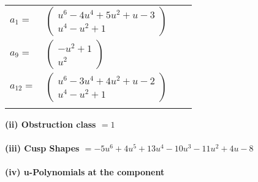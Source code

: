 \documentclass[1p]{elsarticle_modified}
\theoremstyle{definition}
\begin{document}
\begin{tabular}{m{7pt} m{180pt} m{7pt} m{180pt} }
\flushright $a_{1}=$&$\begin{pmatrix}u^6-4 u^4+5 u^2+u-3\\u^4- u^2+1\end{pmatrix}$ \\
\flushright $a_{9}=$&$\begin{pmatrix}- u^2+1\\u^2\end{pmatrix}$ \\
\flushright $a_{12}=$&$\begin{pmatrix}u^6-3 u^4+4 u^2+u-2\\u^4- u^2+1\end{pmatrix}$\\&\end{tabular}
\flushleft \textbf{(ii) Obstruction class $= 1$}\\~\\
\flushleft \textbf{(iii) Cusp Shapes $= -5 u^6+4 u^5+13 u^4-10 u^3-11 u^2+4 u-8$}\\~\\
\newpage\renewcommand{\arraystretch}{1}
\flushleft \textbf{(iv) u-Polynomials at the component}\newline \\
\end{document}
